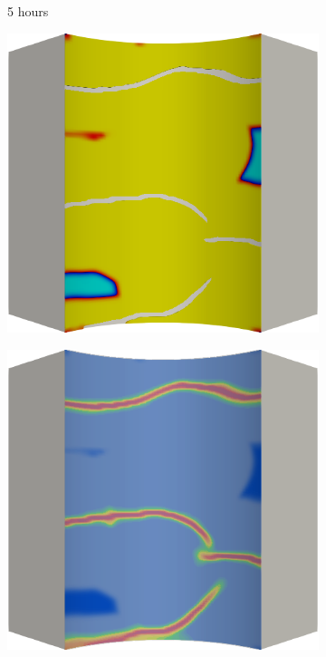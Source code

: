 \begin{figure}[!htbp]
  \begin{subfigure}{0.15\textwidth}
    \centering
    \caption*{5 hours}
  \end{subfigure}
  \begin{subfigure}{0.19\textwidth}
    \centering
    \includegraphics[width=\textwidth]{Chapter5/figures/spallation/c.0033}
  \end{subfigure}
  \hspace{0.06\textwidth}
  \begin{subfigure}{0.19\textwidth}
    \centering
    \includegraphics[width=\textwidth]{Chapter5/figures/spallation/d.0033}

\end{subfigure}
\end{figure}
